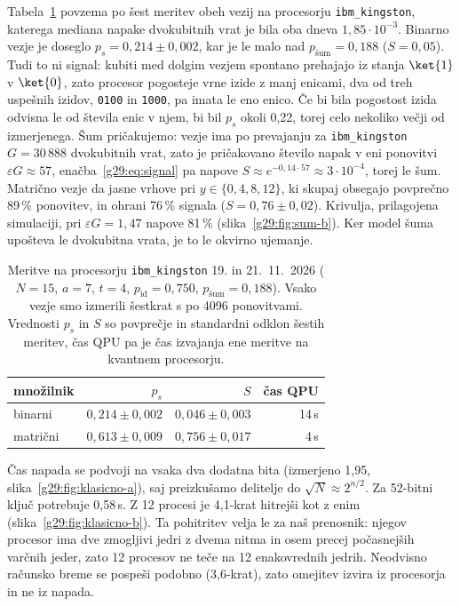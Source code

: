  Tabela~\ref{g29:tab:ibm} povzema po šest meritev obeh vezij na procesorju \texttt{ibm\_kingston}, katerega mediana napake dvokubitnih vrat je bila oba dneva $1{,}85 \cdot 10^{-3}$. Binarno vezje je doseglo $p_s = 0{,}214 \pm 0{,}002$, kar je le malo nad $p_\text{šum} = 0{,}188$ ($S = 0{,}05$). Tudi to ni signal: kubiti med dolgim vezjem spontano prehajajo iz stanja $\ket{1}$ v $\ket{0}$, zato procesor pogosteje vrne izide z manj enicami, dva od treh uspešnih izidov, \texttt{0100} in \texttt{1000}, pa imata le eno enico. Če bi bila pogostost izida odvisna le od števila enic v njem, bi bil $p_s$ okoli 0,22, torej celo nekoliko večji od izmerjenega. Šum pričakujemo: vezje ima po prevajanju za \texttt{ibm\_kingston} $G = 30\,888$ dvokubitnih vrat, zato je pričakovano število napak v eni ponovitvi $\varepsilon G \approx 57$, enačba~\eqref{g29:eq:signal} pa napove $S \approx e^{-0{,}14 \cdot 57} \approx 3 \cdot 10^{-4}$, torej le šum. Matrično vezje da jasne vrhove pri $y \in \{0, 4, 8, 12\}$, ki skupaj obsegajo povprečno 89\,\% ponovitev, in ohrani 76\,\% signala ($S = 0{,}76 \pm 0{,}02$). Krivulja, prilagojena simulaciji, pri $\varepsilon G = 1{,}47$ napove 81\,\% (slika~\ref{g29:fig:sum-b}). Ker model šuma upošteva le dvokubitna vrata, je to le okvirno ujemanje.

\begin{table}[htbp]
\caption{Meritve na procesorju \texttt{ibm\_kingston} 19. in 21.~11.~2026 ($N = 15$, $a = 7$, $t = 4$, $p_\text{id} = 0{,}750$, $p_\text{šum} = 0{,}188$). Vsako vezje smo izmerili šestkrat s po 4096 ponovitvami. Vrednosti $p_s$ in $S$ so povprečje in standardni odklon šestih meritev, čas QPU pa je čas izvajanja ene meritve na kvantnem procesorju.}
\label{g29:tab:ibm}
\centering
\footnotesize
\setlength{\tabcolsep}{5pt}
\begin{tabular}{lrrr}
\toprule
množilnik & $p_s$ & $S$ & čas QPU \\
\midrule
binarni & $0{,}214 \pm 0{,}002$ & $0{,}046 \pm 0{,}003$ & 14\,s \\
matrični & $0{,}613 \pm 0{,}009$ & $0{,}756 \pm 0{,}017$ & 4\,s \\
\bottomrule
\end{tabular}
\end{table}

 Čas napada se podvoji na vsaka dva dodatna bita (izmerjeno 1,95, slika~\ref{g29:fig:klasicno-a}), saj preizkušamo delitelje do $\sqrt{N} \approx 2^{n/2}$. Za 52-bitni ključ potrebuje 0,58\,s. Z 12 procesi je 4,1-krat hitrejši kot z enim (slika~\ref{g29:fig:klasicno-b}). Ta pohitritev velja le za naš prenosnik: njegov procesor ima dve zmogljivi jedri z dvema nitma in osem precej počasnejših varčnih jeder, zato 12 procesov ne teče na 12 enakovrednih jedrih. Neodvisno računsko breme se pospeši podobno (3,6-krat), zato omejitev izvira iz procesorja in ne iz napada.

